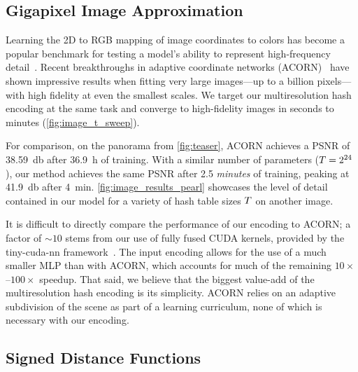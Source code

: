 \documentclass[acmtog,authorversion]{acmart}
\begin{document}
\subsection{Gigapixel Image Approximation}%
\label{Sec:Experiments:image_approximation}


Learning the 2D to RGB mapping of image coordinates to colors has become a popular benchmark for testing a model's ability to represent high-frequency detail~\citep{sitzmann2019siren,mueller2019nis,martel2021acorn,tancik2020fourfeat}.
Recent breakthroughs in adaptive coordinate networks (ACORN)~\citep{martel2021acorn} have shown impressive results when fitting very large images---up to a billion pixels---with high fidelity at even the smallest scales.
We target our multiresolution hash encoding at the same task and converge to high-fidelity images in seconds to minutes (\autoref{fig:image_t_sweep}).

For comparison, on the \sceneTokyo{} panorama from \autoref{fig:teaser}, ACORN achieves a PSNR of \SI{38.59}{\decibel} after \SI{36.9}{\hour} of training.
With a similar number of parameters (${T = 2^{24}}$), our method achieves the same PSNR after \num{2.5} \emph{minutes} of training, peaking at \SI{41.9}{\decibel} after \SI{4}{\minute}.
\autoref{fig:image_results_pearl} showcases the level of detail contained in our model for a variety of hash table sizes $T$ on another image.

It is difficult to directly compare the performance of our encoding to ACORN; a factor of ${\sim\!10}$ stems from our use of fully fused CUDA kernels, provided by the tiny-cuda-nn framework~\citep{tiny-cuda-nn}.
The input encoding allows for the use of a much smaller MLP than with ACORN, which accounts for much of the remaining ${10\times}$--${100\times}$ speedup.
That said, we believe that the biggest value-add of the multiresolution hash encoding is its simplicity.
ACORN relies on an adaptive subdivision of the scene as part of a learning curriculum, none of which is necessary with our encoding. 


\subsection{Signed Distance Functions}\label{Sec:Experiments:sdf}
\end{document}
